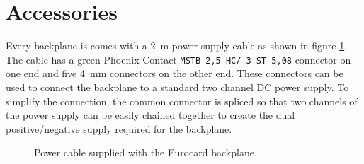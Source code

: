 \documentclass[10pt]{datasheet}
\begin{document}
\section{Accessories}
Every backplane is comes with a \qty{2}{\m} power supply cable as shown in figure \ref{fig:power_cable}. The cable has a green Phoenix Contact \texttt{\small{MSTB 2,5 HC/ 3-ST-5,08}} connector on one end and five \qty{4}{\mm} connectors on the other end. These connectors can be used to connect the backplane to a standard two channel DC power supply. To simplify the connection, the common connector is spliced so that two channels of the power supply can be easily chained together to create the dual positive/negative supply required for the backplane.

\begin{figure}[ht]
    \caption{Power cable supplied with the Eurocard backplane.}
    \label{fig:power_cable}
    \centering
    
\end{figure}
\end{document}
